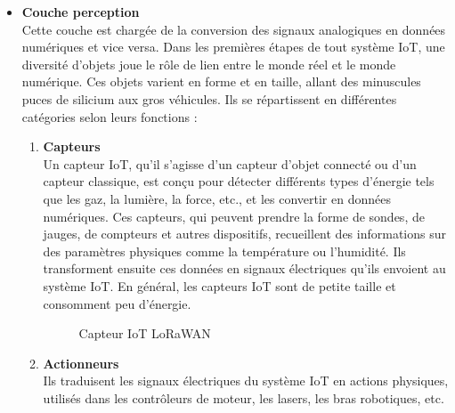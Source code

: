 \documentclass{report}
\begin{document}
\begin{itemize}
\item {\large\textbf{Couche perception}}  \\

Cette couche est chargée de la conversion des signaux analogiques en données numériques et vice versa. Dans les premières étapes de tout système IoT, une diversité d'objets joue le rôle de lien entre le monde réel et le monde numérique. Ces objets varient en forme et en taille, allant des minuscules puces de silicium aux gros véhicules. Ils se répartissent en différentes catégories selon leurs fonctions :
\begin{enumerate}
\item \textbf{Capteurs} \\
Un capteur IoT, qu'il s'agisse d'un capteur d'objet connecté ou d'un capteur classique, est conçu pour détecter différents types d'énergie tels que les gaz, la lumière, la force, etc., et les convertir en données numériques. Ces capteurs, qui peuvent prendre la forme de sondes, de jauges, de compteurs et autres dispositifs, recueillent des informations sur des paramètres physiques comme la température ou l'humidité. Ils transforment ensuite ces données en signaux électriques qu'ils envoient au système IoT. En général, les capteurs IoT sont de petite taille et consomment peu d'énergie. \cite{Web 6 : iotindustriel.com} \\
 
  \begin{figure}[h]
        \centering
        \caption{Capteur IoT LoRaWAN \cite{Web 7 :www.ip-systemes.com}}
        \label{b}
    \end{figure}
\item \textbf{Actionneurs} \\
Ils traduisent les signaux électriques du système IoT en actions physiques, utilisés dans les contrôleurs de moteur, les lasers, les bras robotiques, etc.\\


\end{enumerate}
\end{itemize}
\end{document}
